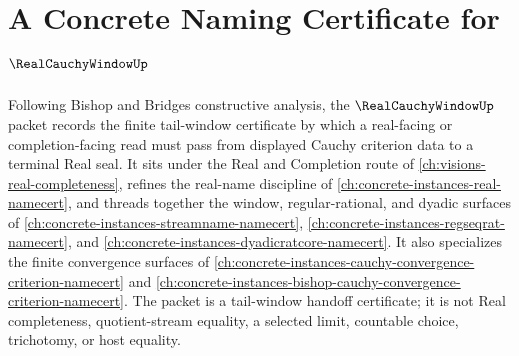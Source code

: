 \chapter{A Concrete Naming Certificate for $\RealCauchyWindowUp$}
\label{ch:concrete-instances-real-cauchy-window-namecert}

Following Bishop and Bridges constructive analysis, the $\RealCauchyWindowUp$ packet records the finite tail-window certificate by which a real-facing or completion-facing read must pass from displayed Cauchy criterion data to a terminal Real seal. It sits under the Real and Completion route of \autoref{ch:visions-real-completeness}, refines the real-name discipline of \autoref{ch:concrete-instances-real-namecert}, and threads together the window, regular-rational, and dyadic surfaces of \autoref{ch:concrete-instances-streamname-namecert}, \autoref{ch:concrete-instances-regseqrat-namecert}, and \autoref{ch:concrete-instances-dyadicratcore-namecert}. It also specializes the finite convergence surfaces of \autoref{ch:concrete-instances-cauchy-convergence-criterion-namecert} and \autoref{ch:concrete-instances-bishop-cauchy-convergence-criterion-namecert}. The packet is a tail-window handoff certificate; it is not Real completeness, quotient-stream equality, a selected limit, countable choice, trichotomy, or host equality.

